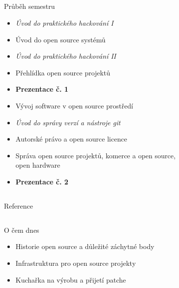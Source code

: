 \documentclass{beamer}
\begin{document}
\subsection{}
\begin{frame}{Průběh semestru}
\begin{itemize}
\item {\em Úvod do praktického hackování I}
\item Úvod do open source systémů
\item {\em Úvod do praktického hackování II}
\item Přehlídka open source projektů
\item {\bf Prezentace č. 1}
\item Vývoj software v open source prostředí
\item {\em Úvod do správy verzí a nástroje git}
\item Autorské právo a open source licence
\item Správa open source projektů, komerce a open source,\\open hardware
\item {\bf Prezentace č. 2}
\end{itemize}
\end{frame}

\subsection{}
\begin{frame}{Reference}
\end{frame}

\subsection{}
\begin{frame}{O čem dnes}
\begin{itemize}
\item Historie open source a důležité záchytné body
\item Infrastruktura pro open source projekty
\item Kuchařka na výrobu a přijetí patche
\end{itemize}
\end{frame}
\end{document}
